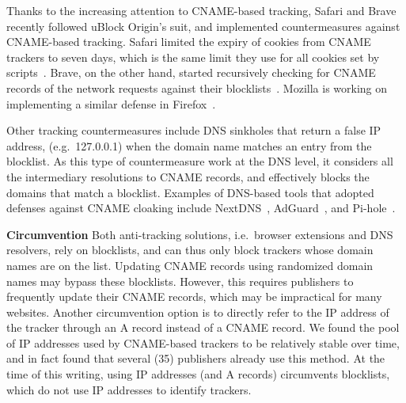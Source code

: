 Thanks to the increasing attention to CNAME-based tracking,
Safari and Brave recently followed uBlock Origin's suit, and implemented countermeasures against CNAME-based tracking.
Safari limited the expiry of cookies from CNAME trackers to seven days, which is the same limit they use for all cookies set by scripts~\cite{safari-cname-defense}.
Brave, on the other hand, started recursively checking for CNAME records of the network requests against their blocklists~\cite{brave-cname-defense}.
Mozilla is working on implementing a similar defense in Firefox~\cite{firefox-cname-defense}.



Other tracking countermeasures include DNS sinkholes that return a false IP address, (e.g.\ 127.0.0.1) when the domain name matches an entry from the blocklist.
As this type of countermeasure work at the DNS level, it considers all the intermediary resolutions to CNAME records, and effectively blocks the domains that match a blocklist.
Examples of DNS-based tools that adopted defenses against CNAME cloaking include NextDNS~\cite{nextdns2019cnamearticle}, AdGuard~\cite{adguardcnamedefense}, and Pi-hole~\cite{piholecnamedefense}.


\textbf{Circumvention}
Both anti-tracking solutions, i.e.\ browser extensions and DNS resolvers, rely on blocklists, and can thus only block trackers whose domain names are on the list.
Updating CNAME records using
randomized domain names may bypass these blocklists.
However, this requires publishers to frequently update their CNAME records, which may be impractical for many websites.
Another circumvention option is to directly refer to the IP address of the tracker through an A record instead of a CNAME record.
We found the pool of IP addresses used by CNAME-based trackers to be relatively stable over time, and in fact found that several (35) publishers already use this method.
At the time of this writing, using IP addresses (and A records) circumvents blocklists, which do not use IP addresses to identify trackers.

